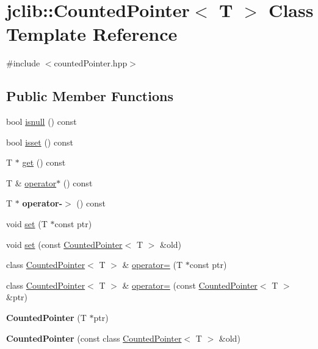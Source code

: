 \hypertarget{classjclib_1_1CountedPointer}{}\section{jclib\+:\+:Counted\+Pointer$<$ T $>$ Class Template Reference}
\label{classjclib_1_1CountedPointer}


{\ttfamily \#include $<$counted\+Pointer.\+hpp$>$}

\subsection*{Public Member Functions}
\begin{DoxyCompactItemize}
\item 
bool \hyperlink{classjclib_1_1CountedPointer_a45787c3b235590582aad6103d7bdc5d0}{isnull} () const
\item 
bool \hyperlink{classjclib_1_1CountedPointer_aba4799319512576d8873edd9239d7073}{isset} () const
\item 
T $\ast$ \hyperlink{classjclib_1_1CountedPointer_ad01d75e50436f7ee6b389c80511465ae}{get} () const
\item 
T \& \hyperlink{classjclib_1_1CountedPointer_a99a1a5e8632a82f9a29ab821afef56c0}{operator$\ast$} () const
\item 
\mbox{\label{classjclib_1_1CountedPointer_af8b35cf35edaf393da1ac2c4c53a97c9}} 
T $\ast$ {\bfseries operator-\/$>$} () const
\item 
void \hyperlink{classjclib_1_1CountedPointer_a11f97ba1153ce2caabe2e44990b54807}{set} (T $\ast$const ptr)
\item 
void \hyperlink{classjclib_1_1CountedPointer_a93e060e76df8f3ac8d20478b128d4514}{set} (const \hyperlink{classjclib_1_1CountedPointer}{Counted\+Pointer}$<$ T $>$ \&old)
\item 
class \hyperlink{classjclib_1_1CountedPointer}{Counted\+Pointer}$<$ T $>$ \& \hyperlink{classjclib_1_1CountedPointer_afb6cd270bc839dd042d9762c92cc1fc5}{operator=} (T $\ast$const ptr)
\item 
class \hyperlink{classjclib_1_1CountedPointer}{Counted\+Pointer}$<$ T $>$ \& \hyperlink{classjclib_1_1CountedPointer_a9321167f476a9bbc6b51477db8ba41f4}{operator=} (const \hyperlink{classjclib_1_1CountedPointer}{Counted\+Pointer}$<$ T $>$ \&ptr)
\item 
\mbox{\label{classjclib_1_1CountedPointer_a0349177cb94d0f9a111177b93802aa29}} 
{\bfseries Counted\+Pointer} (T $\ast$ptr)
\item 
\mbox{\label{classjclib_1_1CountedPointer_a2f7c6c501a3349cbdb0509b0baeb7375}} 
{\bfseries Counted\+Pointer} (const class \hyperlink{classjclib_1_1CountedPointer}{Counted\+Pointer}$<$ T $>$ \&old)
\end{DoxyCompactItemize}


